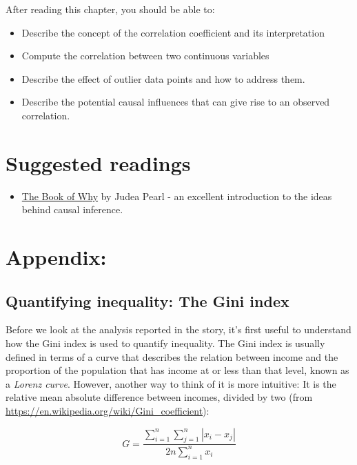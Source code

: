 \documentclass[12pt,]{book}
\providecommand{\tightlist}{%
  \setlength{\itemsep}{0pt}\setlength{\parskip}{0pt}}
\theoremstyle{definition}
\theoremstyle{definition}
\theoremstyle{definition}
\theoremstyle{remark}
\begin{document}
After reading this chapter, you should be able to:

\begin{itemize}
\tightlist
\item
  Describe the concept of the correlation coefficient and its interpretation
\item
  Compute the correlation between two continuous variables
\item
  Describe the effect of outlier data points and how to address them.
\item
  Describe the potential causal influences that can give rise to an observed correlation.
\end{itemize}

\hypertarget{suggested-readings-9}{%
\section{Suggested readings}\label{suggested-readings-9}}

\begin{itemize}
\tightlist
\item
  \href{http://bayes.cs.ucla.edu/WHY/}{The Book of Why} by Judea Pearl - an excellent introduction to the ideas behind causal inference.
\end{itemize}

\hypertarget{appendix-4}{%
\section{Appendix:}\label{appendix-4}}

\hypertarget{quantifying-inequality-the-gini-index}{%
\subsection{Quantifying inequality: The Gini index}\label{quantifying-inequality-the-gini-index}}

Before we look at the analysis reported in the story, it's first useful to understand how the Gini index is used to quantify inequality. The Gini index is usually defined in terms of a curve that describes the relation between income and the proportion of the population that has income at or less than that level, known as a \emph{Lorenz curve}. However, another way to think of it is more intuitive: It is the relative mean absolute difference between incomes, divided by two (from \url{https://en.wikipedia.org/wiki/Gini_coefficient}):

\[
G = \frac{\displaystyle{\sum_{i=1}^n \sum_{j=1}^n \left| x_i - x_j \right|}}{\displaystyle{2n\sum_{i=1}^n x_i}} 
\]
\end{document}
